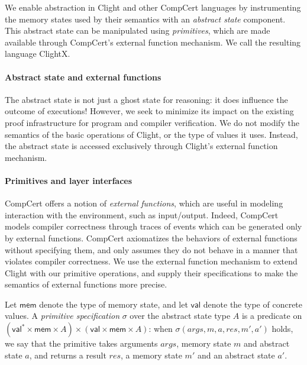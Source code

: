 We enable abstraction in Clight and other CompCert languages
by instrumenting the memory states used by their semantics
with an \emph{abstract state} component.
This abstract state can be manipulated using \emph{primitives},
which are made available through CompCert's external function mechanism.
We call the resulting language ClightX.

\paragraph{Abstract state and external functions}
The abstract state is not just a ghost state for reasoning: it
does influence the outcome of executions!  However, we seek to
minimize its impact on the existing proof
infrastructure for program and compiler verification.
We do not modify the semantics of the basic operations of
Clight, or the type of values it uses.  Instead, the abstract state is
accessed exclusively through Clight's external function mechanism.

\paragraph{Primitives and layer interfaces}
CompCert offers a notion of \emph{external functions}, which are
useful in modeling interaction with the environment, such as
input/output. Indeed, CompCert models compiler correctness through
traces of events which can be generated only by external functions.
CompCert axiomatizes the behaviors of external functions without
specifying them, and only assumes they do not behave in a manner that
violates compiler correctness. We use the external function mechanism
to extend Clight with our primitive operations, and supply their
specifications to make the semantics of external functions more
precise.

\begin{definition} \label{def:c-prim}
Let $\textsf{mem}$ denote the type of memory state, and
let $\textsf{val}$ denote the type of concrete values.
A \emph{primitive specification} $\sigma$ over the abstract state type $A$
is a predicate on $(\textsf{val}^* \times \textsf{mem} \times A) \times
(\textsf{val} \times \textsf{mem} \times
A)$: when $\sigma(\mathit{args}, m, a, \mathit{res}, m', a')$ holds, we say
that the primitive takes arguments $\mathit{args}$, memory state
$m$ and abstract state $a$, and returns a result $\mathit{res}$, a
memory state $m'$ and an abstract state $a'$.
\end{definition}

